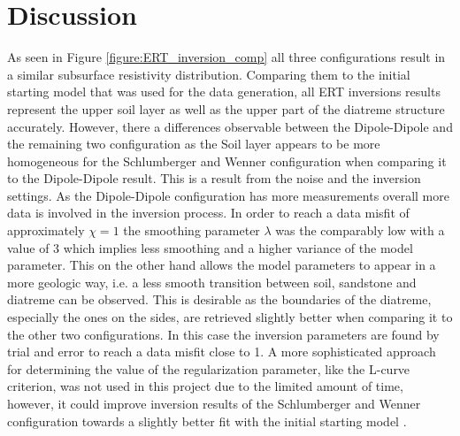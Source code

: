\section{Discussion}\label{section:Discussion}

As seen in Figure \ref{figure:ERT_inversion_comp} all three configurations result in a similar subsurface resistivity distribution. Comparing them to the initial starting model that was used for the data generation, all ERT inversions results represent the upper soil layer as well as the upper part of the diatreme structure accurately. However, there a differences observable between the Dipole-Dipole and the remaining two configuration as the Soil layer appears to be more homogeneous for the Schlumberger and Wenner configuration when comparing it to the Dipole-Dipole result. This is a result from the noise and the inversion settings. As the Dipole-Dipole configuration has more measurements overall more data is involved in the inversion process. In order to reach a data misfit of approximately $\chi=1$ the smoothing parameter $\lambda$ was the comparably low with a value of 3 which implies less smoothing and a higher variance of the model parameter. This on the other hand allows the model parameters to appear in a more geologic way, i.e. a less smooth transition between soil, sandstone and diatreme can be observed. This is desirable as the boundaries of the diatreme, especially the ones on the sides, are retrieved slightly better when comparing it to the other two configurations. In this case the inversion parameters are found by trial and error to reach a data misfit close to 1. A more sophisticated approach for determining the value of the regularization parameter, like the L-curve criterion, was not used in this project due to the limited amount of time, however, it could improve inversion results of the Schlumberger and Wenner configuration towards a slightly better fit with the initial starting model \citep{lawson1995solving}.

